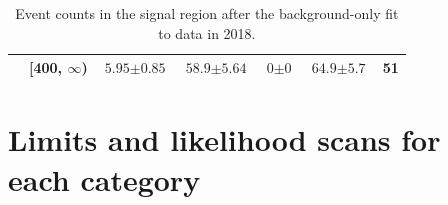 \begin{table}[htbp]
\begin{tabular*}{\linewidth}{@{\extracolsep{\fill}}llccccr}
        & [400, $\infty$) &    $\text{5.95} \pm \text{0.85}$ &     $\text{58.9} \pm \text{5.64}$ &      $\text{0} \pm \text{0}$ &       $\text{64.9} \pm \text{5.7}$ &     51 \\
    \bottomrule
\end{tabular*}
\caption[Event counts in the signal region after the background-only fit to data in 2018]{Event counts in the signal region after the background-only fit to data in 2018.}
\label{tab:yields_SR_B_only_2018}
\end{table}

\clearpage




\section{Limits and likelihood scans for each category}
\label{sec:limits_likelihoods_cats_supplementary}

